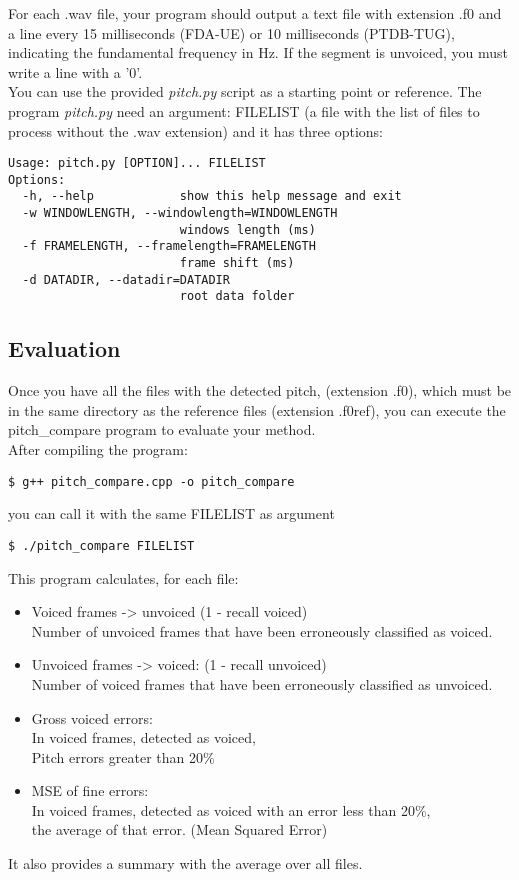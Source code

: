 \documentclass[a4paper,11pt]{article}
\begin{document}
For each .wav file, your program should output a text file with extension .f0 and a line every 15 milliseconds (FDA-UE) or 10 milliseconds (PTDB-TUG), indicating the fundamental frequency in Hz. If the segment is unvoiced, you must write a line with a ’0’.\\
You can use the provided \emph{pitch.py} script as a starting point or reference. The program \emph{pitch.py} need an argument: FILELIST (a file with the list of files to process without the .wav extension) and it has three options:
\begin{lstlisting}
Usage: pitch.py [OPTION]... FILELIST
Options:
  -h, --help            show this help message and exit
  -w WINDOWLENGTH, --windowlength=WINDOWLENGTH
                        windows length (ms)
  -f FRAMELENGTH, --framelength=FRAMELENGTH
                        frame shift (ms)
  -d DATADIR, --datadir=DATADIR
                        root data folder
\end{lstlisting}


\subsection*{Evaluation}
Once you have all the files with the detected pitch, (extension .f0), which must be in the same directory as the reference files (extension .f0ref), you can execute the pitch\_compare program to evaluate your method.\\

After compiling the program:
\begin{lstlisting}
$ g++ pitch_compare.cpp -o pitch_compare
\end{lstlisting}
you can call it with the same FILELIST as argument
\begin{lstlisting}
$ ./pitch_compare FILELIST
\end{lstlisting}
This program calculates, for each file:
\begin{itemize}
\item Voiced frames -> unvoiced (1 - recall voiced)\\
  Number of unvoiced frames that have been erroneously classified as voiced.
\item Unvoiced frames -> voiced: (1 - recall unvoiced)\\
  Number of voiced frames that have been erroneously classified as unvoiced.
\item Gross voiced errors:\\
  In voiced frames, detected as voiced,\\
  Pitch errors greater than 20\%
\item MSE of fine errors:\\
  In voiced frames, detected as voiced with an error less than 20\%,\\
  the average of that error. (Mean Squared Error)
\end{itemize}
It also provides a summary with the average over all files.
\end{document}
